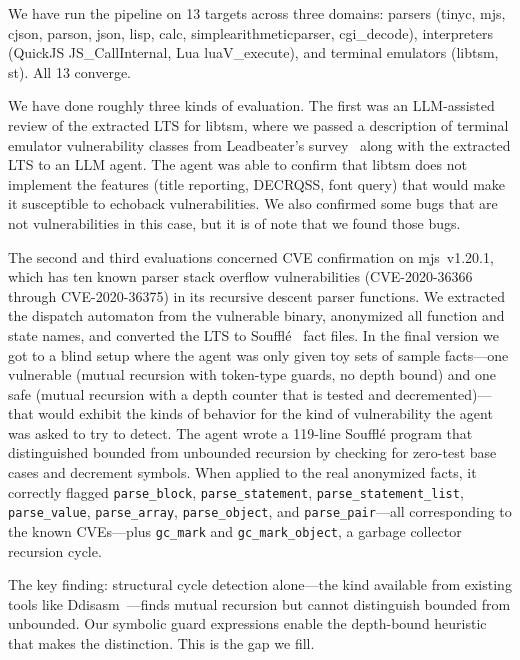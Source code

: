 \documentclass[conference]{./template/IEEEtran}
\begin{document}
We have run the pipeline on 13 targets across three domains: parsers (tinyc, mjs, cjson, parson, json, lisp, calc, simplearithmeticparser, cgi\_decode), interpreters (QuickJS JS\_CallInternal, Lua luaV\_execute), and terminal emulators (libtsm, st). All 13 converge.

We have done roughly three kinds of evaluation. The first was an LLM-assisted review of the extracted LTS for libtsm, where we passed a description of terminal emulator vulnerability classes from Leadbeater's survey~\cite{leadbeater2023terminal} along with the extracted LTS to an LLM agent. The agent was able to confirm that libtsm does not implement the features (title reporting, DECRQSS, font query) that would make it susceptible to echoback vulnerabilities. We also confirmed some bugs that are not vulnerabilities in this case, but it is of note that we found those bugs.

The second and third evaluations concerned CVE confirmation on mjs~v1.20.1, which has ten known parser stack overflow vulnerabilities (CVE-2020-36366 through CVE-2020-36375) in its recursive descent parser functions. We extracted the dispatch automaton from the vulnerable binary, anonymized all function and state names, and converted the LTS to Souffl\'{e}~\cite{jordan2016souffle} fact files. In the final version we got to a blind setup where the agent was only given toy sets of sample facts---one vulnerable (mutual recursion with token-type guards, no depth bound) and one safe (mutual recursion with a depth counter that is tested and decremented)---that would exhibit the kinds of behavior for the kind of vulnerability the agent was asked to try to detect. The agent wrote a 119-line Souffl\'{e} program that distinguished bounded from unbounded recursion by checking for zero-test base cases and decrement symbols. When applied to the real anonymized facts, it correctly flagged \texttt{parse\_block}, \texttt{parse\_statement}, \texttt{parse\_statement\_list}, \texttt{parse\_value}, \texttt{parse\_array}, \texttt{parse\_object}, and \texttt{parse\_pair}---all corresponding to the known CVEs---plus \texttt{gc\_mark} and \texttt{gc\_mark\_object}, a garbage collector recursion cycle.

The key finding: structural cycle detection alone---the kind available from existing tools like Ddisasm~\cite{flores2020ddisasm}---finds mutual recursion but cannot distinguish bounded from unbounded. Our symbolic guard expressions enable the depth-bound heuristic that makes the distinction. This is the gap we fill.
\end{document}
